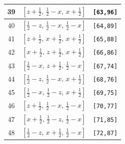 \documentclass[fleqn,8pt]{jsarticle}
\begin{document}
\begin{longtable}{ccc}
39 & $\left[ z + \frac{1}{2},\, \frac{1}{2} - x,\, x + \frac{1}{2} \right]$ & {\tt [63,96]} \\ \hline
40 & $\left[ \frac{1}{2} - z,\, \frac{1}{2} - x,\, \frac{1}{2} - x \right]$ & {\tt [64,89]} \\ \hline
41 & $\left[ z + \frac{1}{2},\, x + \frac{1}{2},\, x + \frac{1}{2} \right]$ & {\tt [65,88]} \\ \hline
42 & $\left[ x + \frac{1}{2},\, z + \frac{1}{2},\, x + \frac{1}{2} \right]$ & {\tt [66,86]} \\ \hline
43 & $\left[ \frac{1}{2} - x,\, z + \frac{1}{2},\, \frac{1}{2} - x \right]$ & {\tt [67,74]} \\ \hline
44 & $\left[ \frac{1}{2} - z,\, \frac{1}{2} - x,\, x + \frac{1}{2} \right]$ & {\tt [68,76]} \\ \hline
45 & $\left[ \frac{1}{2} - x,\, \frac{1}{2} - z,\, x + \frac{1}{2} \right]$ & {\tt [69,75]} \\ \hline
46 & $\left[ z + \frac{1}{2},\, \frac{1}{2} - x,\, \frac{1}{2} - x \right]$ & {\tt [70,77]} \\ \hline
47 & $\left[ x + \frac{1}{2},\, \frac{1}{2} - z,\, \frac{1}{2} - x \right]$ & {\tt [71,85]} \\ \hline
48 & $\left[ \frac{1}{2} - z,\, x + \frac{1}{2},\, \frac{1}{2} - x \right]$ & {\tt [72,87]} \\
\end{longtable}
\renewcommand{\arraystretch}{1.2}
\end{document}
